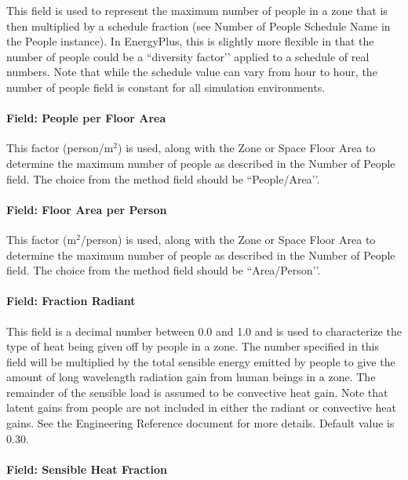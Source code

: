This field is used to represent the maximum number of people in a zone that is then multiplied by a schedule fraction (see Number of People Schedule Name in the People instance). In EnergyPlus, this is slightly more flexible in that the number of people could be a ``diversity factor’’ applied to a schedule of real numbers. Note that while the schedule value can vary from hour to hour, the number of people field is constant for all simulation environments.

\paragraph{Field: People per Floor Area}\label{field-people-per-zone-floor-area-people-definition}

This factor (person/m\(^{2}\)) is used, along with the Zone or Space Floor Area to determine the maximum number of people as described in the Number of People field. The choice from the method field should be ``People/Area’’.

\paragraph{Field: Floor Area per Person}\label{field-zone-floor-area-per-person-people-definition}

This factor (m\(^{2}\)/person) is used, along with the Zone or Space Floor Area to determine the maximum number of people as described in the Number of People field. The choice from the method field should be ``Area/Person’’.

\paragraph{Field: Fraction Radiant}\label{field-fraction-radiant-people-definition}

This field is a decimal number between 0.0 and 1.0 and is used to characterize the type of heat being given off by people in a zone. The number specified in this field will be multiplied by the total sensible energy emitted by people to give the amount of long wavelength radiation gain from human beings in a zone. The remainder of the sensible load is assumed to be convective heat gain. Note that latent gains from people are not included in either the radiant or convective heat gains. See the Engineering Reference document for more details. Default value is 0.30.

\paragraph{Field: Sensible Heat Fraction}\label{field-sensible-heat-fraction-people-definition}

